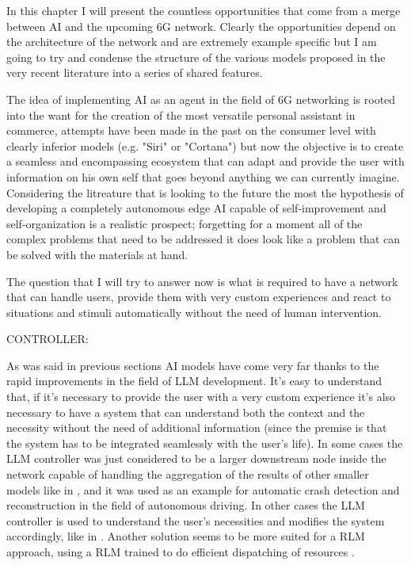 

In this chapter I will present the countless opportunities that come from a merge between AI and the
upcoming 6G network. Clearly the opportunities depend on the architecture of the network and are
extremely example specific but I am going to try and condense the structure of the various models
proposed in the very recent literature into a series of shared features.

The idea of implementing AI as an agent in the field of 6G networking is rooted into the want for
the creation of the most versatile personal assistant in commerce, attempts have been made in the
past on the consumer level with clearly inferior models (e.g. "Siri" or "Cortana") but now the
objective is to create a seamless and encompassing ecosystem that can adapt and provide the user
with information on his own self that goes beyond anything we can currently imagine. Considering the
litreature that is looking to the future the most the hypothesis of developing a completely
autonomous edge AI capable of self-improvement and self-organization \cite{ai4ci} is a realistic
prospect; forgetting for a moment all of the complex problems that need to be addressed it does look
like a problem that can be solved with the materials at hand.

The question that I will try to answer now is what is required to have a network that can handle
users, provide them with very custom experiences and react to situations and stimuli automatically
without the need of human intervention.

\bigskip
\noindent
CONTROLLER:
\label{ssec:controller}

As was said in previous sections AI models have come very far thanks to the rapid improvements in
the field of LLM development. It's easy to understand that, if it's necessary to provide the user
with a very custom experience it's also necessary to have a system that can understand both the
context and the necessity without the need of additional information (since the premise is that the
system has to be integrated seamlessly with the user's life).
In some cases the LLM controller was just considered to be a larger downstream node inside the
network capable of handling the aggregation of the results of other smaller models like in
\cite{pga}, and it was used as an example for automatic crash detection and reconstruction in the
field of autonomous driving.
In other cases the LLM controller is used to understand the user's necessities and modifies the
system accordingly, like in \cite{ai4ci}. Another solution seems to be more suited for a RLM
approach, using a RLM trained to do efficient dispatching of resources \cite{llm6G}.

